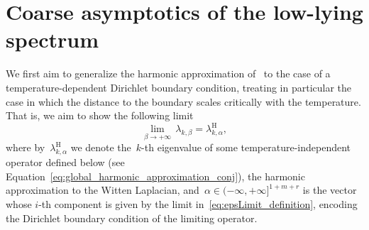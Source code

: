 \documentclass[10pt]{article}
\newcommand{\cL}{\mathcal{L}}
\newcommand{\1}{\mathbbm 1}
\begin{document}



    \section{Coarse asymptotics of the low-lying spectrum}
    We first aim to generalize the harmonic approximation of~\cite{S83} to the case of a temperature-dependent Dirichlet boundary condition, treating in particular the case in which the distance to the boundary scales critically with the temperature.
    That is, we aim to show the following limit
   ~$$\underset{\beta\to+\infty}{\lim}\,\lambda_{k,\beta} = \lambda_{k,\alpha}^{\mathrm H},$$
    where by~$\lambda_{k,\alpha}^{\mathrm H}$ we denote the~$k$-th eigenvalue of some temperature-independent operator defined below (see Equation~\eqref{eq:global_harmonic_approximation_conj}), the harmonic approximation to the Witten Laplacian, and~$\alpha\in(-\infty,+\infty]^{1+m+r}$ is the vector whose $i$-th component is given by the limit in~\eqref{eq:epsLimit_definition}, encoding the Dirichlet boundary condition of the limiting operator.
\end{document}
